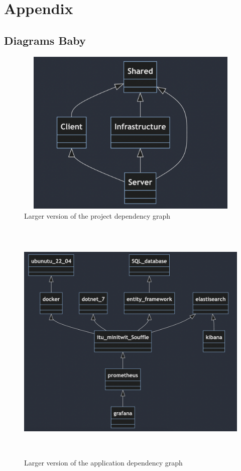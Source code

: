 \section{Appendix}
\subsection{Diagrams Baby}

\begin{figure}[H]
    \centering
    \includegraphics[width = 15.0cm, height = 8.0cm]{Report/Images/onionStructure.png}
    \caption{Larger version of the project dependency graph}
    \label{fig:projectDependencyGraph}
\end{figure}
\begin{figure}[H]
    \centering
    \includegraphics[width = 15.0cm, height = 12.0cm]{Report/Images/application_dependencies.png}
    \caption{Larger version of the application dependency graph}
    \label{fig:ApplicationDependencyGraph}
\end{figure}

